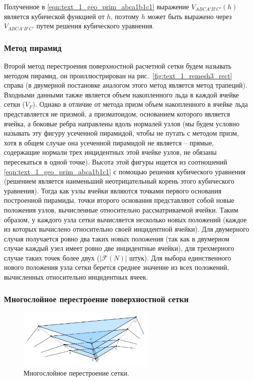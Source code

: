 Полученное в \eqref{eqn:text_1_geo_prim_abca1b1c1} выражение $V_{ABCA'B'C'}(h)$ является кубической функцией от $h$, поэтому $h$ может быть выражено через $V_{ABCA'B'C'}$ путем решения кубического уравнения.

\subsubsection{Метод пирамид}

Второй метод перестроения поверхностной расчетной сетки будем называть методом пирамид, он проиллюстрирован на рис.~\ref{fig:text_1_remesh3_rect} справа (в двумерной постановке аналогом этого метод является метод трапеций).
Входными данными также является объем накопленного льда в каждой ячейке сетки ($V_F$).
Однако в отличие от метода призм объем накопленного в ячейке льда представляется не призмой, а призматоидом, основанием которого является ячейка, а боковые ребра направлены вдоль нормалей узлов (мы будем условно называть эту фигуру усеченной пирамидой, чтобы не путать с методом призм, хотя в общем случае она усеченной пирамидой не является -- прямые, содержащие нормали трех инцидентных этой ячейке узлов, не обязаны пересекаться в одной точке).
Высота этой фигуры ищется из соотношений \eqref{eqn:text_1_geo_prim_abca1b1c1} с помощью решения кубического уравнения (решением является наименьший неотрицательный корень этого кубического уравнения).
Тогда как узлы ячейки являются точками первого основания построенной пирамиды, точки второго основания представляют собой новые положения узлов, вычисленные относительно рассматриваемой ячейки.
Таким образом, у каждого узла сетки вычисляется несколько новых положений (каждое из которых вычислено относительно своей инцидентной ячейки).
Для двумерного случая получается ровно два таких новых положения (так как в двумерном случае каждый узел имеет ровно две инцидентные ячейки), для трехмерного случае таких точек более двух ($|\mathscr{F}(N)|$ штук).
Для выбора единственного нового положения узла сетки берется среднее значение из всех положений, вычисленных относительно инцидентных ячеек.

\subsubsection{Многослойное перестроение поверхностной сетки}

\begin{figure}[ht]
\centering
\includegraphics[width=0.6\textwidth]{fig/3dr_classical_methods_multilayer_3d.pdf}
\singlespacing
{}\caption{Многослойное перестроение сетки.}
\label{fig:text_1_remesh3_multi}
\end{figure}

